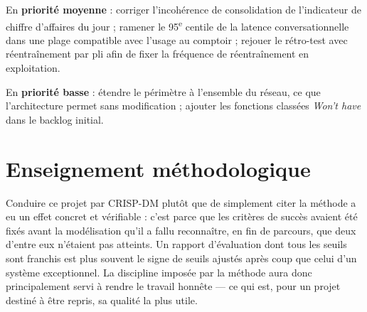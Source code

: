 En \textbf{priorité moyenne} : corriger l'incohérence de consolidation de l'indicateur de chiffre d'affaires du jour ; ramener le 95\textsuperscript{e} centile de la latence conversationnelle dans une plage compatible avec l'usage au comptoir ; rejouer le rétro-test avec réentraînement par pli afin de fixer la fréquence de réentraînement en exploitation.

En \textbf{priorité basse} : étendre le périmètre à l'ensemble du réseau, ce que l'architecture permet sans modification ; ajouter les fonctions classées \textit{Won't have} dans le backlog initial.

\section*{Enseignement méthodologique}

Conduire ce projet par CRISP-DM plutôt que de simplement citer la méthode a eu un effet concret et vérifiable : c'est parce que les critères de succès avaient été fixés avant la modélisation qu'il a fallu reconnaître, en fin de parcours, que deux d'entre eux n'étaient pas atteints. Un rapport d'évaluation dont tous les seuils sont franchis est plus souvent le signe de seuils ajustés après coup que celui d'un système exceptionnel. La discipline imposée par la méthode aura donc principalement servi à rendre le travail honnête — ce qui est, pour un projet destiné à être repris, sa qualité la plus utile.
